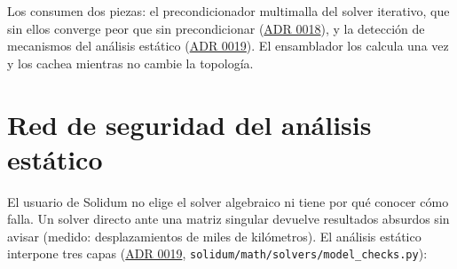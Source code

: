 \documentclass[11pt,oneside]{report}
\begin{document}
Los consumen dos piezas: el precondicionador multimalla del solver iterativo, que sin ellos converge peor que sin precondicionar (\hyperref[adr:0018]{ADR 0018}), y la detección de mecanismos del análisis estático (\hyperref[adr:0019]{ADR 0019}). El ensamblador los calcula una vez y los cachea mientras no cambie la topología.

\section{Red de seguridad del análisis estático}

El usuario de Solidum no elige el solver algebraico ni tiene por qué conocer cómo falla. Un solver directo ante una matriz singular devuelve resultados absurdos sin avisar (medido: desplazamientos de miles de kilómetros). El análisis estático interpone tres capas (\hyperref[adr:0019]{ADR 0019}, \texttt{solidum/\allowbreak{}math/\allowbreak{}solvers/\allowbreak{}model\_\allowbreak{}checks.\allowbreak{}py}):
\end{document}
